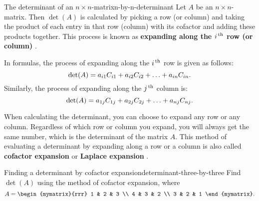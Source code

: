 \begin{definition}{The determinant of an $n\times n$-matrix}{n-by-n-determinant}
  Let $A$ be an $n\times n$-matrix. Then $\det(A)$ is calculated by
  picking a row (or column) and taking the product of each entry in
  that row (column) with its cofactor and adding these products
  together. This process is known as \textbf{expanding along the
    $i\th$ row (or column)}%
  .
  \bigskip
  
  In formulas, the process of expanding along the $i\th$ row is given
  as follows:
  \begin{equation*}
    \det(A) =
    a_{i1}\cof{A}{i1} + a_{i2}\cof{A}{i2} + \ldots + a_{in}\cof{A}{in}.
  \end{equation*}
  Similarly, the process of expanding along the $j\th$ column is:
  \begin{equation*}
    \det(A) =
    a_{1j}\cof{A}{1j} + a_{2j}\cof{A}{2j} + \ldots + a_{nj}\cof{A}{nj}.
  \end{equation*}
  
\end{definition}

When calculating the determinant, you can choose to expand any row or
any column. Regardless of which row or column you expand, you will
always get the same number, which is the determinant of the matrix
$A$.  This method of evaluating a determinant by expanding along a row
or a column is also called \textbf{cofactor expansion}%
%
 or \textbf{Laplace expansion}%
%
.

\begin{example}{Finding a determinant by cofactor expansion}{determinant-three-by-three}
  Find $\det(A)$ using the method of cofactor expansion, where
  \begin{equation*}
    A = \begin{mymatrix}{rrr}
      1 & 2 & 3 \\
      4 & 3 & 2 \\
      3 & 2 & 1
    \end{mymatrix}.
  \end{equation*}
\end{example}

